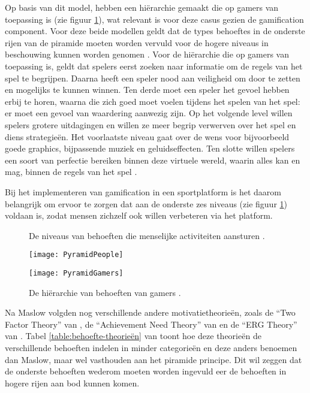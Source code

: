 Op basis van dit model, hebben \textcite{Siang2003} een hiërarchie gemaakt die op gamers van toepassing is (zie figuur \ref{fig:gamers-hierarchy}), wat relevant is voor deze casus gezien de gamification component.
Voor deze beide modellen geldt dat de types behoeftes in de onderste rijen van de piramide moeten worden vervuld voor de hogere niveaus in beschouwing kunnen worden genomen \autocite{Richter2014}.
Voor de hiërarchie die op gamers van toepassing is, geldt dat spelers eerst zoeken naar informatie om de regels van het spel te begrijpen. Daarna heeft een speler nood aan veiligheid om door te zetten en mogelijks te kunnen winnen. Ten derde moet een speler het gevoel hebben erbij te horen, waarna die zich goed moet voelen tijdens het spelen van het spel: er moet een gevoel van waardering aanwezig zijn. Op het volgende level willen spelers grotere uitdagingen en willen ze meer begrip verwerven over het spel en diens strategieën. Het voorlaatste niveau gaat over de wens voor bijvoorbeeld goede graphics, bijpassende muziek en geluidseffecten. Ten slotte willen spelers een soort van perfectie bereiken binnen deze virtuele wereld, waarin alles kan en mag, binnen de regels van het spel \autocite{Greitzer2007, Siang2003}.

Bij het implementeren van gamification in een sportplatform is het daarom belangrijk om ervoor te zorgen dat aan de onderste zes niveaus (zie figuur \ref{fig:gamers-hierarchy}) voldaan is, zodat mensen zichzelf ook willen verbeteren via het platform.

\begin{figure}[htbp]
    \begin{minipage}[t]{0.48\linewidth} %
        \centering
        \caption[Behoeften-hiërarchie algemeen]{De  niveaus van behoeften die menselijke activiteiten aansturen \autocite{Lilienfeld2014}.}
        \texttt{[image: PyramidPeople]}
        \label{fig:people-hierarchy}
    \end{minipage}
    \hfill
    \begin{minipage}[t]{0.48\linewidth} %
        \centering
        \caption[Behoeften-hiërarchie gamers]{De hiërarchie van behoeften van gamers \autocite{Richter2014}.}
        \texttt{[image: PyramidGamers]}
        \label{fig:gamers-hierarchy}
    \end{minipage}
\end{figure}

Na Maslow volgden nog verschillende andere motivatietheorieën, zoals de “Two Factor Theory” van \textcite{Herzberg1959}, de “Achievement Need Theory” van \textcite{McClelland1961} en de “ERG Theory” van \textcite{Alderfer1969}. Tabel \ref{table:behoefte-theorieën} van \textcite{Benke2019} toont hoe deze theorieën de verschillende behoeften indelen in minder categorieën en deze anders benoemen dan Maslow, maar wel vasthouden aan het piramide principe. Dit wil zeggen dat de onderste behoeften wederom moeten worden ingevuld eer de behoeften in hogere rijen aan bod kunnen komen.

